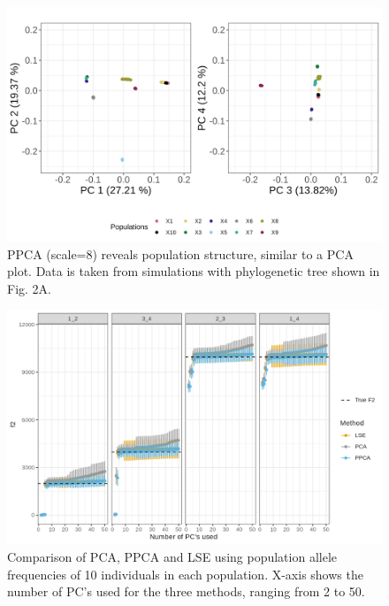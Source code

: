 \documentclass[12pt, letterpaper]{article}
\begin{document}
\begin{figure}[ht!]
    \includegraphics[width=16.5cm]{plots/supplementary/pcplot1.png}
    \centering
    \caption{PPCA (scale=8) reveals population structure, similar to a PCA plot. Data is taken from simulations with phylogenetic tree shown in Fig. 2A.}
    \label{figS1:pc_scale}
\end{figure}

\begin{figure}[ht!]
    \includegraphics[width=16.5cm]{plots/supplementary/Ne1000_split_times1000_npop10_nind100_mu0_f2_plot_scale_test_ind.png}
    \centering
    \caption{Comparison of PCA, PPCA and LSE using population allele frequencies of 10 individuals in each population. X-axis shows the number of PC's used for the three methods, ranging from 2 to 50.}
    \label{figS1:pc_scale}
\end{figure}
\end{document}
